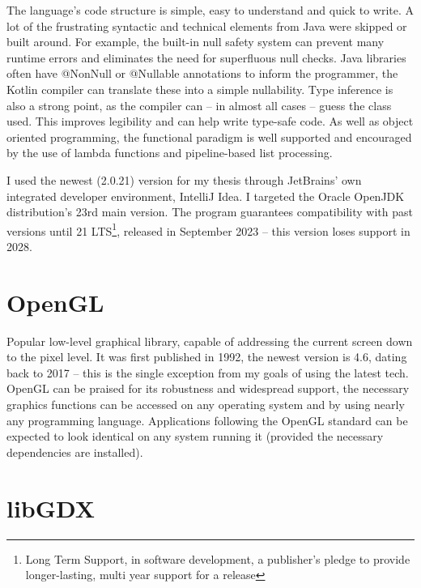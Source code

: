 The language's code structure is simple, easy to understand and quick to write. A lot of the frustrating syntactic and technical elements from Java were skipped or built around. For example, the built-in null safety system can prevent many runtime errors and eliminates the need for superfluous null checks. Java libraries often have @NonNull or @Nullable annotations to inform the programmer, the Kotlin compiler can translate these into a simple nullability. Type inference is also a strong point, as the compiler can -- in almost all cases -- guess the class used. This improves legibility and can help write type-safe code. As well as object oriented programming, the functional paradigm is well supported and encouraged by the use of lambda functions and pipeline-based list processing.


I used the newest (2.0.21) version for my thesis through JetBrains' own integrated developer environment, IntelliJ Idea. I targeted the Oracle OpenJDK distribution's 23rd main version. The program guarantees compatibility with past versions until 21 LTS\footnote{Long Term Support, in software development, a publisher's pledge to provide longer-lasting, multi year support for a release}, released in September 2023 -- this version loses support in 2028.~\cite{JavaRoadmap}

\section{OpenGL }

Popular low-level graphical library, capable of addressing the current screen down to the pixel level. It was first published in 1992, the newest version is 4.6, dating back to 2017 -- this is the single exception from my goals of using the latest tech.~\cite{OpenglHistory} OpenGL can be praised for its robustness and widespread support, the necessary graphics functions can be accessed on any operating system and by using nearly any programming language. Applications following the OpenGL standard can be expected to look identical on any system running it (provided the necessary dependencies are installed).

\section{libGDX }

